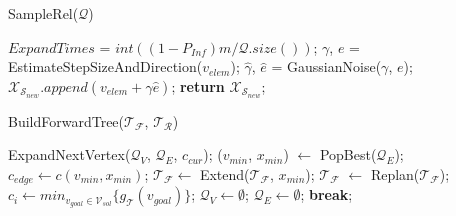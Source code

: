 \begin{algorithm}[t]
	\caption{SampleRel($\mathcal{Q}$)}
    \label{SampleRelevantRegion}
        \begin{algorithmic}[1]
            \State $ExpandTimes$ = $int( (1 - P_{Inf}) m / \mathcal{Q}.size() )$;    \label{NumOfReleventQueue}
                \State $\gamma$, $e$ = EstimateStepSizeAndDirection($v_{elem}$);
                    \State $\hat{\gamma}$, $\hat{e}$ = GaussianNoise($\gamma$, $e$);
                    \State $\mathcal{X}_{\mathcal{S}_{new}}.append(v_{elem} + \hat{\gamma}\hat{e})$;
                \EndFor
            \EndFor
            \State \textbf{return} $\mathcal{X}_{\mathcal{S}_{new}}$;
        \end{algorithmic}
\end{algorithm}

\begin{algorithm}[t]
    \caption{BuildForwardTree($\mathcal{T}_{\mathcal{F}}$, $\mathcal{T}_{\mathcal{R}}$)}
    \label{BuildForwardTreeFunction}
        \begin{algorithmic}[1]
             \label{ExpandNextVertex}
            \State ExpandNextVertex($\mathcal{Q}_{V}$, $\mathcal{Q}_{E}$, $c_{cur}$);    
            \EndWhile
            \State ($v_{min}$, $x_{min}$) $\gets$ PopBest($\mathcal{Q}_{E}$);
                    \State $c_{edge} \gets c(v_{min}, x_{min})$;
                           \label{EndPostpone}
                            \State $\mathcal{T}_{\mathcal{F}} \gets$ Extend($\mathcal{T}_{\mathcal{F}}$, $x_{min}$);
                            \State $\mathcal{T}_{\mathcal{F}}$ $\gets$ Replan($\mathcal{T}_{\mathcal{F}}$);
                            \State $c_i \gets min_{v_{goal} \in \mathcal{V}_{sol} }\{ g_\mathcal{T}(v_{goal}) \}$;
                        \EndIf
                    \EndIf
                \EndIf
            \Else 
                \State $\mathcal{Q}_V \gets \emptyset$; $\mathcal{Q}_E \gets \emptyset$;
                \State \textbf{break};
            \EndIf
            \EndWhile
        \end{algorithmic}
\end{algorithm}

